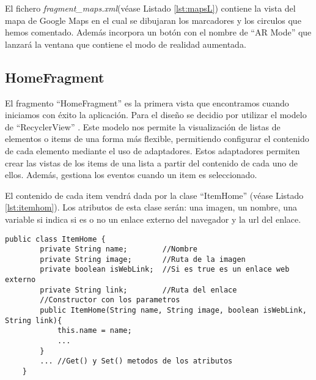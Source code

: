 \bigskip



El fichero \textit{fragment\_maps.xml}(véase Listado \ref{lst:mapsL}) contiene la vista del mapa de Google Maps en el cual se dibujaran los marcadores y los circulos que hemos comentado. Además incorpora un botón con el nombre de ``AR Mode'' que lanzará la ventana que contiene el modo de realidad aumentada.


    

\subsection{HomeFragment}

El fragmento ``HomeFragment'' es la primera vista que encontramos cuando iniciamos con éxito la aplicación. Para el diseño se decidio por utilizar el modelo de ``RecyclerView'' \cite{URL::recycler}. Este modelo nos permite la visualización de listas de elementos o items de una forma más flexible, permitiendo configurar el contenido de cada elemento mediante el uso de adaptadores. Estos adaptadores permiten crear las vistas de los items de una lista a partir del contenido de cada uno de ellos. Además, gestiona los eventos cuando un item es seleccionado.

El contenido de cada item vendrá dada por la clase ``ItemHome'' (véase Listado \ref{lst:itemhom}). Los atributos de esta clase serán: una imagen, un nombre, una variable si indica si es o no un enlace externo del navegador y la url del enlace.

\begin{lstlisting}[caption={Fichero \textit{ItemHome.java}.},  label={lst:itemhom}]
    public class ItemHome {
        private String name;        //Nombre
        private String image;       //Ruta de la imagen
        private boolean isWebLink;  //Si es true es un enlace web externo
        private String link;        //Ruta del enlace
        //Constructor con los parametros
        public ItemHome(String name, String image, boolean isWebLink, String link){
            this.name = name;
            ...
        }
        ... //Get() y Set() metodos de los atributos
    }
\end{lstlisting}

